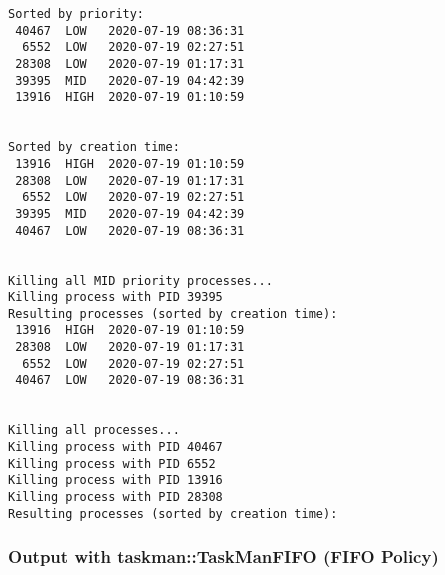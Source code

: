 \documentclass[a4paper]{scrartcl}
\begin{document}
\begin{verbatim}
Sorted by priority:
 40467  LOW   2020-07-19 08:36:31
  6552  LOW   2020-07-19 02:27:51
 28308  LOW   2020-07-19 01:17:31
 39395  MID   2020-07-19 04:42:39
 13916  HIGH  2020-07-19 01:10:59


Sorted by creation time:
 13916  HIGH  2020-07-19 01:10:59
 28308  LOW   2020-07-19 01:17:31
  6552  LOW   2020-07-19 02:27:51
 39395  MID   2020-07-19 04:42:39
 40467  LOW   2020-07-19 08:36:31


Killing all MID priority processes...
Killing process with PID 39395
Resulting processes (sorted by creation time):
 13916  HIGH  2020-07-19 01:10:59
 28308  LOW   2020-07-19 01:17:31
  6552  LOW   2020-07-19 02:27:51
 40467  LOW   2020-07-19 08:36:31


Killing all processes...
Killing process with PID 40467
Killing process with PID 6552
Killing process with PID 13916
Killing process with PID 28308
Resulting processes (sorted by creation time):
\end{verbatim}


\subsubsection{Output with taskman::TaskManFIFO (FIFO Policy)}
\end{document}
